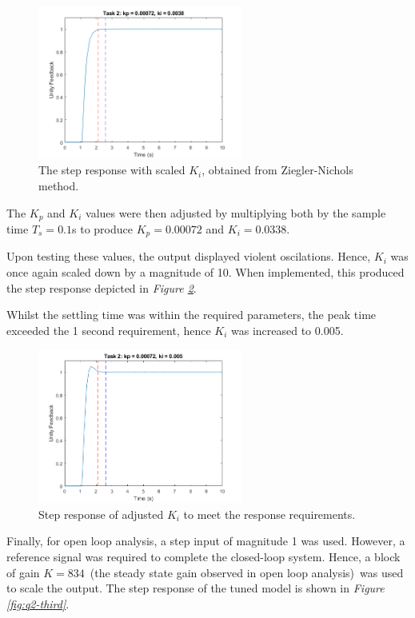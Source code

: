 \documentclass[11pt, onecolumn]{article}
\begin{document}
\begin{figure}[h!]
    \centering
    \includegraphics[width=0.6\textwidth]{q2-g2.png}
    \caption{The step response with scaled $K_i$, obtained from Ziegler-Nichols method.}
    \label{fig:q2-first}
\end{figure}
\par The $K_p$ and $K_i$ values were then adjusted by multiplying both by the sample time $T_s = 0.1$s to produce $K_p = 0.00072$ and $K_i = 0.0338$.
\par Upon testing these values, the output displayed violent oscilations. Hence, $K_i$ was once again scaled down by a magnitude of 10. When implemented, this produced the step response depicted in \textit{Figure \ref{fig:q2-second}}.
\par Whilst the settling time was within the required parameters, the peak time exceeded the 1 second requirement, hence $K_i$ was increased to 0.005.
\begin{figure}[h!]
    \centering
    \includegraphics[width=0.6\textwidth]{q2-g3.png}
    \caption{Step response of adjusted $K_i$ to meet the response requirements.}
    \label{fig:q2-second}
\end{figure}
\par Finally, for open loop analysis, a step input of magnitude 1 was used. However, a reference signal was required to complete the closed-loop system. Hence, a block of gain $K=834$ (the steady state gain observed in open loop analysis) was used to scale the output. The step response of the tuned model is shown in \textit{Figure \ref{fig:q2-third}}.
\end{document}
